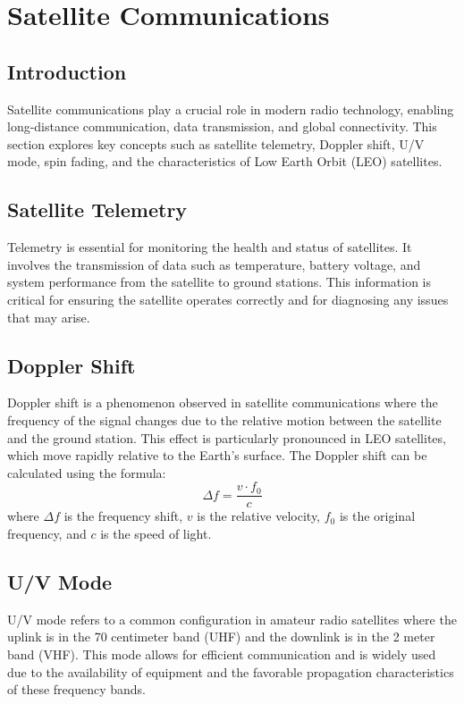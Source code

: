 \section{Satellite Communications}
\label{section:satellite_communications}

\subsection*{Introduction}
Satellite communications play a crucial role in modern radio technology, enabling long-distance communication, data transmission, and global connectivity. This section explores key concepts such as satellite telemetry, Doppler shift, U/V mode, spin fading, and the characteristics of Low Earth Orbit (LEO) satellites.

\subsection*{Satellite Telemetry}
Telemetry is essential for monitoring the health and status of satellites. It involves the transmission of data such as temperature, battery voltage, and system performance from the satellite to ground stations. This information is critical for ensuring the satellite operates correctly and for diagnosing any issues that may arise.

\subsection*{Doppler Shift}
Doppler shift is a phenomenon observed in satellite communications where the frequency of the signal changes due to the relative motion between the satellite and the ground station. This effect is particularly pronounced in LEO satellites, which move rapidly relative to the Earth's surface. The Doppler shift can be calculated using the formula:
\begin{equation}
    \Delta f = \frac{v \cdot f_0}{c}
    \label{eq:doppler_shift}
\end{equation}
where \( \Delta f \) is the frequency shift, \( v \) is the relative velocity, \( f_0 \) is the original frequency, and \( c \) is the speed of light.

\subsection*{U/V Mode}
U/V mode refers to a common configuration in amateur radio satellites where the uplink is in the 70 centimeter band (UHF) and the downlink is in the 2 meter band (VHF). This mode allows for efficient communication and is widely used due to the availability of equipment and the favorable propagation characteristics of these frequency bands.

